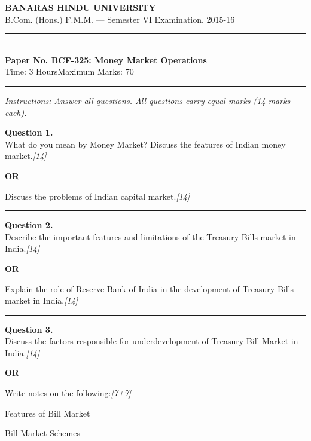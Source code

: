 \documentclass[11pt,a4paper]{article}
\newcommand{\pts}[1]{\hfill   \textit{[#1]}}
\begin{document}
\begin{center}
  {\large\bfseries BANARAS HINDU UNIVERSITY}\\[2pt]
  {\normalsize B.Com. (Hons.) F.M.M. --- Semester VI Examination, 2015-16}\\[6pt]
  \rule{0.8\linewidth}{0.5pt}\\[6pt]
  {\large\bfseries Paper No. BCF-325: Money Market Operations}\\[4pt]
  {\normalsize Time: 3 Hours\hfill Maximum Marks: 70}
\end{center}

\rule{\linewidth}{0.4pt}

\smallskip



\noindent   \textit{Instructions: Answer all questions. All questions carry equal marks (14 marks each).}

\bigskip




\noindent   \textbf{Question 1.} \\
What do you mean by Money Market? Discuss the features of Indian money market.\pts{14}

\centerline{   \textbf{OR}}

Discuss the problems of Indian capital market.\pts{14}

\medskip\rule{\linewidth}{0.2pt}




\noindent   \textbf{Question 2.} \\
Describe the important features and limitations of the Treasury Bills market in India.\pts{14}

\centerline{   \textbf{OR}}

Explain the role of Reserve Bank of India in the development of Treasury Bills market in India.\pts{14}

\medskip\rule{\linewidth}{0.2pt}

\pagebreak




\noindent   \textbf{Question 3.} \\
Discuss the factors responsible for underdevelopment of Treasury Bill Market in India.\pts{14}

\centerline{   \textbf{OR}}

Write notes on the following:\pts{7+7}

\begin{parts}
  \item Features of Bill Market
  \item Bill Market Schemes
\end{parts}
\end{document}
